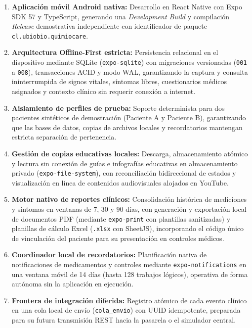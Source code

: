 \begin{enumerate}
    \item \textbf{Aplicación móvil Android nativa:} Desarrollo en React Native con Expo SDK 57 y TypeScript, generando una \textit{Development Build} y compilación \textit{Release} demostrativa independiente con identificador de paquete \texttt{cl.ubiobio.quimiocare}.
    \item \textbf{Arquitectura Offline-First estricta:} Persistencia relacional en el dispositivo mediante SQLite (\texttt{expo-sqlite}) con migraciones versionadas (\texttt{001} a \texttt{008}), transacciones ACID y modo WAL, garantizando la captura y consulta ininterrumpida de signos vitales, síntomas libres, cuestionarios médicos asignados y contexto clínico sin requerir conexión a internet.
    \item \textbf{Aislamiento de perfiles de prueba:} Soporte determinista para dos pacientes sintéticos de demostración (Paciente A y Paciente B), garantizando que las bases de datos, copias de archivos locales y recordatorios mantengan estricta separación de pertenencia.
    \item \textbf{Gestión de copias educativas locales:} Descarga, almacenamiento atómico y lectura sin conexión de guías e infografías educativas en almacenamiento privado (\texttt{expo-file-system}), con reconciliación bidireccional de estados y visualización en línea de contenidos audiovisuales alojados en YouTube.
    \item \textbf{Motor nativo de reportes clínicos:} Consolidación histórica de mediciones y síntomas en ventanas de 7, 30 y 90 días, con generación y exportación local de documentos PDF (mediante \texttt{expo-print} con plantillas sanitizadas) y planillas de cálculo Excel (\texttt{.xlsx} con SheetJS), incorporando el código único de vinculación del paciente para su presentación en controles médicos.
    \item \textbf{Coordinador local de recordatorios:} Planificación nativa de notificaciones de medicamentos y controles mediante \texttt{expo-notifications} en una ventana móvil de 14 días (hasta 128 trabajos lógicos), operativa de forma autónoma sin la aplicación en ejecución.
    \item \textbf{Frontera de integración diferida:} Registro atómico de cada evento clínico en una cola local de envío (\texttt{cola\_envio}) con UUID idempotente, preparada para su futura transmisión REST hacia la pasarela o el simulador central.
\end{enumerate}

